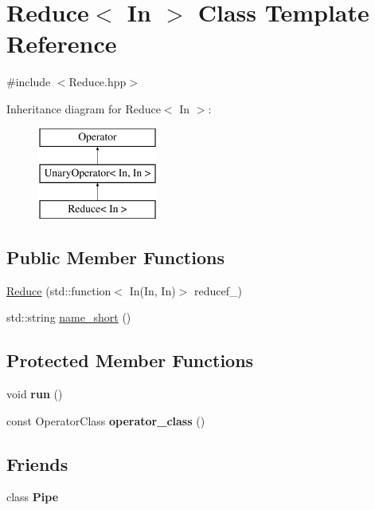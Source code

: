 \hypertarget{class_reduce}{\section{\-Reduce$<$ \-In $>$ \-Class \-Template \-Reference}
\label{class_reduce}
}


{\ttfamily \#include $<$\-Reduce.\-hpp$>$}

\-Inheritance diagram for \-Reduce$<$ \-In $>$\-:\begin{figure}[H]
\begin{center}
\leavevmode
\includegraphics[height=3.000000cm]{class_reduce}
\end{center}
\end{figure}
\subsection*{\-Public \-Member \-Functions}
\begin{DoxyCompactItemize}
\item 
\hyperlink{class_reduce_aca83bb85365a9f7063734f2fe9f98df5}{\-Reduce} (std\-::function$<$ \-In(\-In, \-In)$>$ reducef\-\_\-)
\item 
std\-::string \hyperlink{class_reduce_ac714421091164ce0c8e476f90b6002f0}{name\-\_\-short} ()
\end{DoxyCompactItemize}
\subsection*{\-Protected \-Member \-Functions}
\begin{DoxyCompactItemize}
\item 
\hypertarget{class_reduce_af3e480efa114503bb9bfc2ae363b0750}{void {\bfseries run} ()}\label{class_reduce_af3e480efa114503bb9bfc2ae363b0750}

\item 
\hypertarget{class_reduce_a2b550adc98a8dd58cfe14d51562712b2}{const \-Operator\-Class {\bfseries operator\-\_\-class} ()}\label{class_reduce_a2b550adc98a8dd58cfe14d51562712b2}

\end{DoxyCompactItemize}
\subsection*{\-Friends}
\begin{DoxyCompactItemize}
\item 
\hypertarget{class_reduce_adb788d0aa2d64624d3602a985936d7da}{class {\bfseries \-Pipe}}\label{class_reduce_adb788d0aa2d64624d3602a985936d7da}

\end{DoxyCompactItemize}


